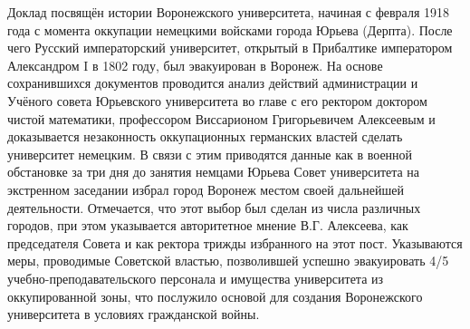




Доклад посвящён истории Воронежского университета,
начиная с февраля 1918 года с момента оккупации немецкими войсками города Юрьева (Дерпта).
После чего Русский императорский университет, открытый в Прибалтике императором Александром I в 1802 году,
был эвакуирован в Воронеж.
На основе сохранившихся документов проводится анализ действий администрации и Учёного совета Юрьевского университета во главе с его ректором доктором чистой математики, профессором Виссарионом Григорьевичем Алексеевым и доказывается незаконность оккупационных германских властей сделать университет немецким. В связи с этим приводятся данные как в военной обстановке за три дня до занятия немцами Юрьева Совет университета на экстренном заседании избрал город Воронеж местом своей дальнейшей деятельности. Отмечается, что этот выбор был сделан из числа различных городов, при этом указывается авторитетное мнение В.Г.  Алексеева, как председателя Совета и как ректора трижды избранного на этот пост. Указываются меры, проводимые Советской властью, позволившей успешно эвакуировать 4/5 учебно-преподавательского персонала и имущества университета из оккупированной зоны, что послужило основой для создания Воронежского университета в условиях гражданской войны.

\litlist

